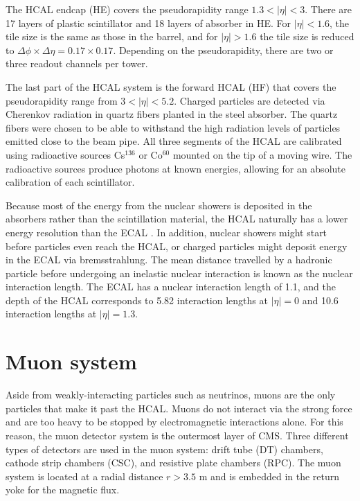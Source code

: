 The HCAL endcap (HE) covers the pseudorapidity range $1.3 < |\eta| < 3$. There are 17 layers of plastic scintillator and 18 layers of absorber in HE. For $|\eta| < 1.6$, the tile size is the same as those in the barrel, and for $|\eta| >1.6$ the tile size is reduced to $\Delta\phi \times \Delta\eta = 0.17 \times 0.17$. Depending on the pseudorapidity, there are two or three readout channels per tower.
 
The last part of the HCAL system is the forward HCAL (HF) that covers the pseudorapidity range from $3 < |\eta| < 5.2$. Charged particles are detected via Cherenkov radiation in quartz fibers planted in the steel absorber. The quartz fibers were chosen to be able to withstand the high radiation levels of particles emitted close to the beam pipe. 
All three segments of the HCAL are calibrated using radioactive sources Cs$^{136}$ or Co$^{60}$ mounted on the tip of a moving wire. The radioactive sources produce photons at known energies, allowing for an absolute calibration of each scintillator. 

Because most of the energy from the nuclear showers is deposited in the absorbers rather than the scintillation material, 
the HCAL naturally has a lower energy resolution than the ECAL . In addition, nuclear showers might start 
before particles even reach the HCAL, or charged particles might deposit energy in the ECAL via bremsstrahlung. 
The mean distance travelled by a hadronic particle before undergoing 
an inelastic nuclear interaction is known as the nuclear interaction length. The ECAL has a nuclear interaction length 
of 1.1, and the depth of the HCAL corresponds to 5.82 interaction lengths at $|\eta|=0$ and 10.6 interaction lengths at $|\eta|=1.3$. 





\section{Muon system}
\label{sec:Muon}
Aside from weakly-interacting particles such as neutrinos, muons are the only particles that make it past the HCAL. Muons do not interact via the strong force and are too heavy to be stopped by electromagnetic interactions alone. For this reason, the muon detector system is the outermost layer of CMS. Three different types of detectors are used in the muon system: drift tube (DT) chambers, cathode strip chambers (CSC), and resistive plate chambers (RPC). The muon system is located at a radial distance $r > 3.5$ m and is embedded in the return yoke for the magnetic flux.

